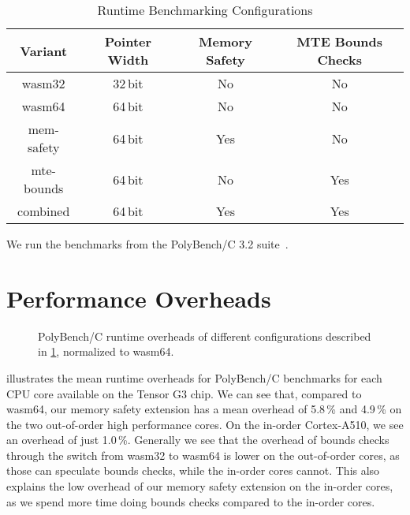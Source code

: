 \begin{table}[ht]
    \centering
    \small
    \begin{tabular}{c || c|c|c}
        \textbf{Variant} & \textbf{Pointer Width} & \textbf{Memory Safety} & \textbf{MTE Bounds Checks} \\
        \hline
        wasm32           & 32\,bit                & No                     & No                         \\
        wasm64           & 64\,bit                & No                     & No                         \\
        mem-safety       & 64\,bit                & Yes                    & No                         \\
        mte-bounds       & 64\,bit                & No                     & Yes                        \\
        combined         & 64\,bit                & Yes                    & Yes                        \\
    \end{tabular}
    \caption{Runtime Benchmarking Configurations}
    \label{tab:benchmark-variants}
\end{table}

\noindent
We run the benchmarks from the PolyBench/C 3.2 suite~\cite{polybenchc}.


\section{Performance Overheads}
\label{sec:performance-overheads}

\begin{figure}[ht]
    \centering
    
    \caption{PolyBench/C runtime overheads of different configurations described in \cref{tab:benchmark-variants}, normalized to wasm64.}
    \label{fig:runtime-overheads-combined}
\end{figure}

 illustrates the mean runtime overheads for PolyBench/C benchmarks for each CPU core available on the Tensor G3 chip.
We can see that, compared to wasm64, our memory safety extension has a mean overhead of 5.8\,\% and 4.9\,\% on the two out-of-order high performance cores.
On the in-order Cortex-A510, we see an overhead of just 1.0\,\%.
Generally we see that the overhead of bounds checks through the switch from wasm32 to wasm64 is lower on the out-of-order cores, as those can speculate bounds checks, while the in-order cores cannot.
This also explains the low overhead of our memory safety extension on the in-order cores, as we spend more time doing bounds checks compared to the in-order cores.

